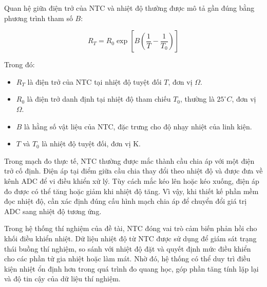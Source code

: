 Quan hệ giữa điện trở của NTC và nhiệt độ thường được mô tả gần đúng bằng phương trình tham số \(B\):

\begin{equation}
R_T = R_0 \exp\left[B\left(\frac{1}{T} - \frac{1}{T_0}\right)\right]
\end{equation}

Trong đó:
\begin{itemize}
    \item \(R_T\) là điện trở của NTC tại nhiệt độ tuyệt đối \(T\), đơn vị \(\Omega\).
    \item \(R_0\) là điện trở danh định tại nhiệt độ tham chiếu \(T_0\), thường là \(25^\circ C\), đơn vị \(\Omega\).
    \item \(B\) là hằng số vật liệu của NTC, đặc trưng cho độ nhạy nhiệt của linh kiện.
    \item \(T\) và \(T_0\) là nhiệt độ tuyệt đối, đơn vị K.
\end{itemize}

Trong mạch đo thực tế, NTC thường được mắc thành cầu chia áp với một điện trở cố định. Điện áp tại điểm giữa cầu chia thay đổi theo nhiệt độ và được đưa về kênh ADC để vi điều khiển xử lý. Tùy cách mắc kéo lên hoặc kéo xuống, điện áp đo được có thể tăng hoặc giảm khi nhiệt độ tăng. Vì vậy, khi thiết kế phần mềm đọc nhiệt độ, cần xác định đúng cấu hình mạch chia áp để chuyển đổi giá trị ADC sang nhiệt độ tương ứng.

Trong hệ thống thí nghiệm của đề tài, NTC đóng vai trò cảm biến phản hồi cho khối điều khiển nhiệt. Dữ liệu nhiệt độ từ NTC được sử dụng để giám sát trạng thái buồng thí nghiệm, so sánh với nhiệt độ đặt và quyết định mức điều khiển cho các phần tử gia nhiệt hoặc làm mát. Nhờ đó, hệ thống có thể duy trì điều kiện nhiệt ổn định hơn trong quá trình đo quang học, góp phần tăng tính lặp lại và độ tin cậy của dữ liệu thí nghiệm.

\newpage
